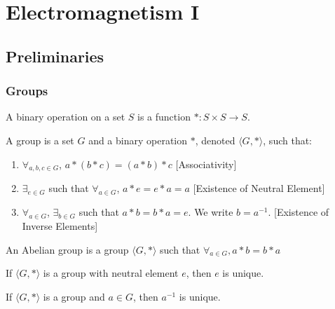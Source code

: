 \documentclass[crop=false,class=article,oneside]{standalone}
\begin{document}
    \ifx\ifgeoalg\undefined
        \section*{Electromagnetism I}
        \setcounter{section}{1}
    \fi
    \subsection{Preliminaries}
        \subsubsection{Groups}
            \begin{definition}
                A binary operation on a set $S$ is a
                function $*:S\times S \rightarrow S$.
            \end{definition}
            \begin{definition}
                A group is a set $G$ and a binary operation $*$,
                denoted $\langle G,*\rangle$, such that:
                \begin{enumerate}
                    \item $\forall_{a,b,c\in G}$, $a*(b*c)=(a*b)*c$
                          \hfill[Associativity]
                    \item $\exists_{e\in G}$ such that
                          $\forall_{a\in G}$, $a*e=e*a=a$
                          \hfill[Existence of Neutral Element]
                    \item $\forall_{a\in G}$, $\exists_{b\in G}$
                          such that $a*b=b*a=e$.
                          We write $b=a^{-1}$.
                          \hfill[Existence of Inverse Elements]
                \end{enumerate}
            \end{definition}
            \begin{definition}
                An Abelian group is a group $\langle G,*\rangle$
                such that $\forall_{a\in G},a*b=b*a$
            \end{definition}
            \begin{theorem}
                If $\langle G, *\rangle$ is a group with neutral
                element $e$, then $e$ is unique.
            \end{theorem}
            \begin{theorem}
                If $\langle G,*\rangle$ is a group and $a\in G$,
                then $a^{-1}$ is unique.
            \end{theorem}
\end{document}
